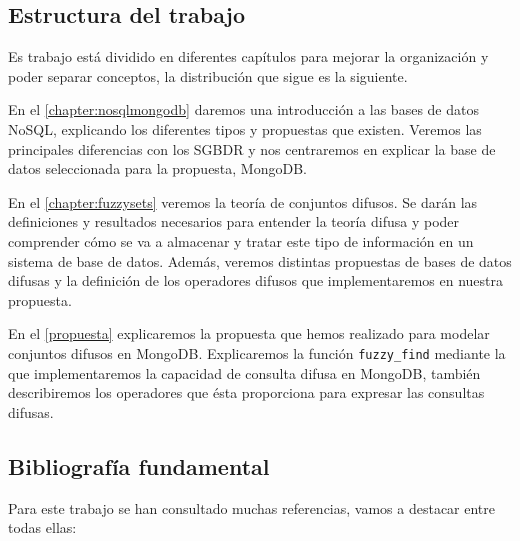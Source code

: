 \subsection{Estructura del trabajo}

Es trabajo está dividido en diferentes capítulos para mejorar la organización y poder separar conceptos, la distribución que sigue es la siguiente.

En el \autoref{chapter:nosqlmongodb} daremos una introducción a las bases de datos NoSQL, explicando los diferentes tipos y propuestas que existen. Veremos las principales diferencias con los SGBDR y nos centraremos en explicar la base de datos seleccionada para la propuesta, MongoDB.

En el \autoref{chapter:fuzzysets} veremos la teoría de conjuntos difusos. Se darán las definiciones y resultados necesarios para entender la teoría difusa y poder comprender cómo se va a almacenar y tratar este tipo de información en un sistema de base de datos. Además, veremos distintas propuestas de bases de datos difusas y la definición de los operadores difusos que implementaremos en nuestra propuesta.

En el \autoref{propuesta} explicaremos la propuesta que hemos realizado para modelar conjuntos difusos en MongoDB. Explicaremos la función \texttt{fuzzy\_find} mediante la que implementaremos la capacidad de consulta difusa en MongoDB, también describiremos los operadores que ésta proporciona para expresar las consultas difusas.

\subsection{Bibliografía fundamental}

Para este trabajo se han consultado muchas referencias, vamos a destacar entre todas ellas:

